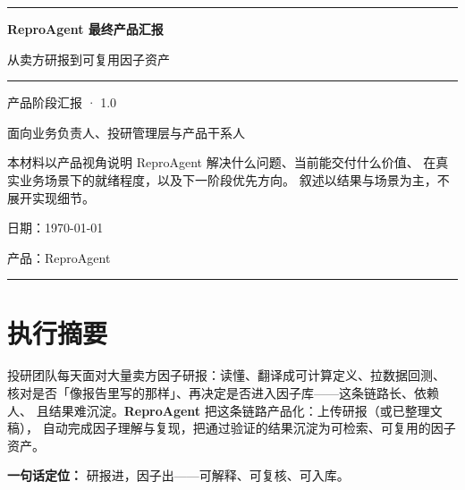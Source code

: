 \documentclass[UTF8,a4paper,11pt]{ctexart}
\begin{document}
\begin{titlepage}
  \centering
  \vspace*{1.8cm}
  {\color{brand}\rule{\textwidth}{1.2pt}\par}
  \vspace{1.0cm}
  {\Huge\bfseries\color{brand} ReproAgent 最终产品汇报\par}
  \vspace{0.6cm}
  {\Large 从卖方研报到可复用因子资产\par}
  \vspace{0.5cm}
  {\color{softline}\rule{0.45\textwidth}{0.8pt}\par}
  \vspace{0.8cm}
  {\large 产品阶段汇报 · 1.0\par}
  \vspace{0.4cm}
  {\normalsize\textcolor{muted}{面向业务负责人、投研管理层与产品干系人}\par}
  \vspace{1.6cm}
  \begin{minipage}{0.88\textwidth}
    \centering
    \textcolor{muted}{
    本材料以产品视角说明 ReproAgent 解决什么问题、当前能交付什么价值、
    在真实业务场景下的就绪程度，以及下一阶段优先方向。
    叙述以结果与场景为主，不展开实现细节。}
  \end{minipage}
  \vfill
  {\normalsize 日期：\today\par}
  \vspace{0.3cm}
  {\normalsize 产品：ReproAgent\par}
  \vspace{1.0cm}
  {\color{brand}\rule{\textwidth}{1.2pt}\par}
\end{titlepage}

\tableofcontents
\newpage

\section{执行摘要}

投研团队每天面对大量卖方因子研报：读懂、翻译成可计算定义、拉数据回测、
核对是否「像报告里写的那样」、再决定是否进入因子库——这条链路长、依赖人、
且结果难沉淀。\textbf{ReproAgent} 把这条链路产品化：上传研报（或已整理文稿），
自动完成因子理解与复现，把通过验证的结果沉淀为可检索、可复用的因子资产。

\textbf{一句话定位：}
研报进，因子出——可解释、可复核、可入库。
\end{document}
